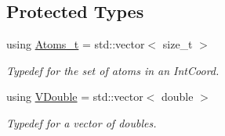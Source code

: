 \subsection*{Protected Types}
\begin{DoxyCompactItemize}
\item 
using \hyperlink{classFManII_1_1IntCoords_a59ab25571f774fca97644a2ce5ade359}{Atoms\+\_\+t} = std\+::vector$<$ size\+\_\+t $>$\hypertarget{classFManII_1_1IntCoords_a59ab25571f774fca97644a2ce5ade359}{}\label{classFManII_1_1IntCoords_a59ab25571f774fca97644a2ce5ade359}

\begin{DoxyCompactList}\small\item\em Typedef for the set of atoms in an Int\+Coord. \end{DoxyCompactList}\item 
using \hyperlink{classFManII_1_1IntCoords_af42df2795dec16350f908cfd5ac2ef06}{V\+Double} = std\+::vector$<$ double $>$\hypertarget{classFManII_1_1IntCoords_af42df2795dec16350f908cfd5ac2ef06}{}\label{classFManII_1_1IntCoords_af42df2795dec16350f908cfd5ac2ef06}

\begin{DoxyCompactList}\small\item\em Typedef for a vector of doubles. \end{DoxyCompactList}\end{DoxyCompactItemize}
